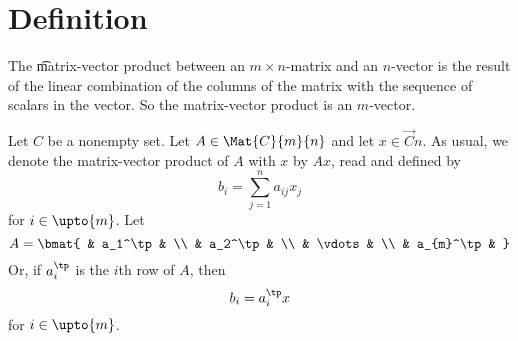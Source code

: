 
\section*{Definition}

The \t{matrix-vector product} between an $m \times  n$-matrix and an $n$-vector is the result of the linear combination of the columns of the matrix with the sequence of scalars in the vector.
So the matrix-vector product is an $m$-vector.


Let $C$ be a nonempty set.
Let $A \in \Mat{C}{m}{n}$ and let $x \in \Vec{C}{n}$.
As usual, we denote the matrix-vector product of $A$ with $x$ by $Ax$, read  and defined by
  \[
b_i = \sum_{j = 1}^{n} a_{ij}x_j
  \]
for $i \in \upto{m}$.
Let
  \[
A = \bmat{
& a_1^\tp & \\
& a_2^\tp & \\
& \vdots & \\
& a_{m}^\tp &
}
  \]
Or, if $a_i^\tp$ is the $i$th row of $A$, then
  \[
b_i = a_i^\tp x
  \]
for $i \in \upto{m}$.

\blankpage
